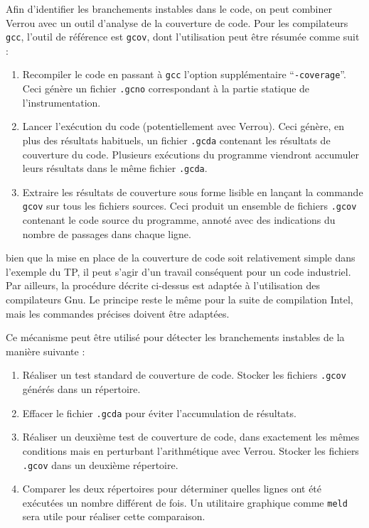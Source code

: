 \documentclass[a4paper]{article}
\newenvironment{info}[1][NB :]{
  \begin{mdframed}[style=info]
    \noindent{\bf #1}
}{
  \end{mdframed}
}
\begin{document}
Afin d'identifier les branchements instables dans le code, on peut combiner
Verrou avec un outil d'analyse de la couverture de code. Pour les compilateurs
\texttt{gcc}, l'outil de référence est \texttt{gcov}, dont l'utilisation peut
être résumée comme suit :
\begin{enumerate}
\item Recompiler le code en passant à \texttt{gcc} l'option supplémentaire
  ``\texttt{-coverage}''. Ceci génère un fichier
  \texttt{.gcno} correspondant à la partie statique de l'instrumentation.
\item Lancer l'exécution du code (potentiellement avec Verrou). Ceci génère, en
  plus des résultats habituels, un fichier \texttt{.gcda} contenant les
  résultats de couverture du code. Plusieurs exécutions du programme viendront
  accumuler leurs résultats dans le même fichier \texttt{.gcda}.
\item Extraire les résultats de couverture sous forme lisible en lançant la
  commande \texttt{gcov} sur tous les fichiers sources. Ceci produit un ensemble
  de fichiers \texttt{.gcov} contenant le code source du programme, annoté avec
  des indications du nombre de passages dans chaque ligne.
\end{enumerate}

\medskip

\begin{info}
  bien que la mise en place de la couverture de code soit relativement simple
  dans l'exemple du TP, il peut s'agir d'un travail conséquent pour un code
  industriel.  Par ailleurs, la procédure décrite ci-dessus est adaptée à
  l'utilisation des compilateurs Gnu. Le principe reste le même pour la suite de
  compilation Intel, mais les commandes précises doivent être adaptées.
\end{info}

\bigskip

\noindent Ce mécanisme peut être utilisé pour détecter les branchements instables de la
manière suivante :
\begin{enumerate}
\item Réaliser un test standard de couverture de code. Stocker les fichiers
  \texttt{.gcov} générés dans un répertoire.
\item Effacer le fichier \texttt{.gcda} pour éviter l'accumulation de résultats.
\item Réaliser un deuxième test de couverture de code, dans exactement les mêmes
  conditions mais en perturbant l'arithmétique avec Verrou. Stocker les fichiers
  \texttt{.gcov} dans un deuxième répertoire.
\item Comparer les deux répertoires pour déterminer quelles lignes ont été
  exécutées un nombre différent de fois. Un utilitaire graphique comme
  \texttt{meld} sera utile pour réaliser cette comparaison.
\end{enumerate}
\end{document}
